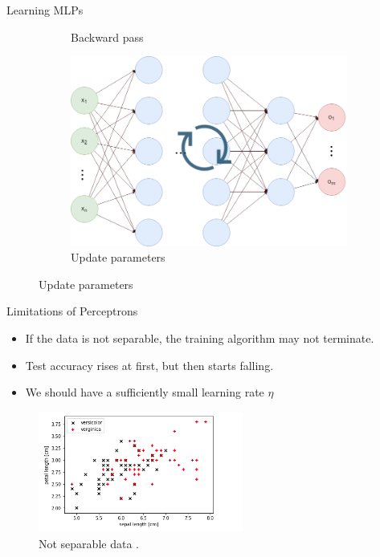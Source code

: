 \begin{frame}{Learning MLPs}
\begin{figure}
\begin{subfigure}[b]{0.3\textwidth}
            \caption{Backward pass}
        \end{subfigure}
        \begin{subfigure}[b]{0.28\textwidth}
            \includegraphics[width=\textwidth]{Figs/update_phase.png}
            \caption{Update parameters}
        \end{subfigure}
    \end{figure}
\end{frame}






\begin{frame}{Limitations of Perceptrons}
    \begin{itemize}
        \item If the data is not separable, the training algorithm may not terminate.
        \item Test accuracy rises at first, but then starts falling.
        \item We should have a sufficiently small learning rate $\eta$
    \end{itemize}
	\begin{figure}[H]
		\centering
		\includegraphics[width=0.6\textwidth]{Figs/Not_Separable_Data.png}
		\caption{Not separable data \cite{https://vitalflux.com/how-know-data-linear-non-linear/}.}
	\end{figure}
\end{frame}

